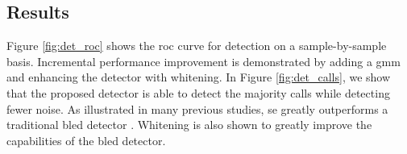 {\subsection{Results}
\label{sec:detector_results}

Figure \ref{fig:det_roc} shows the \ac{roc} curve for detection on a sample-by-sample basis. Incremental performance improvement is demonstrated by adding a \ac{gmm} and enhancing the detector with whitening. In Figure \ref{fig:det_calls}, we show that the proposed detector is able to detect the majority calls while detecting fewer noise.  As illustrated in many previous studies, \ac{se} greatly outperforms a traditional \ac{bled} detector \citep{entropyJASA}. Whitening is also shown to greatly improve the capabilities of the \ac{bled} detector.





}

